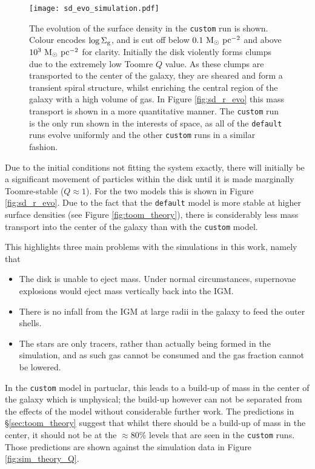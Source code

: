 \begin{figure}[!ht]
    \texttt{[image: sd\_evo\_simulation.pdf]}
    \caption{The evolution of the surface density in the {\tt custom} run is shown. Colour encodes $\log\Sigma_\mathrm{g}$, and is cut off below $0.1 ~\mathrm{M}_{\odot} ~\mathrm{pc}^{-2}$ and above $10^3 ~\mathrm{M}_{\odot} ~\mathrm{pc}^{-2}$ for clarity. Initially the disk violently forms clumps due to the extremely low Toomre $Q$ value. As these clumps are transported to the center of the galaxy, they are sheared and form a transient spiral structure, whilst enriching the central region of the galaxy with a high volume of gas. In Figure \ref{fig:sd_r_evo} this mass transport is shown in a more quantitative manner. The {\tt custom} run is the only run shown in the interests of space, as all of the {\tt default} runs evolve uniformly and the other {\tt custom} runs in a similar fashion.}
    \label{fig:sd_evo_small}
\end{figure}
Due to the initial conditions not fitting the system exactly, there will initially be a significant movement of particles within the disk until it is made marginally Toomre-stable ($Q\approx1$).
For the two models this is shown in Figure \ref{fig:sd_r_evo}.
Due to the fact that the {\tt default} model is more stable at higher surface densities (see Figure \ref{fig:toom_theory}), there is considerably less mass transport into the center of the galaxy than with the {\tt custom} model.

This highlights three main problems with the simulations in this work, namely that
\begin{itemize}
    \item The disk is unable to eject mass. Under normal circumstances, supernovae explosions would eject mass vertically back into the IGM.
    \item There is no infall from the IGM at large radii in the galaxy to feed the outer shells.
    \item The stars are only tracers, rather than actually being formed in the simulation, and as such gas cannot be consumed and the gas fraction cannot be lowered.
\end{itemize}
In the {\tt custom} model in partuclar, this leads to a build-up of mass in the center of the galaxy which is unphysical; the build-up however can not be separated from the effects of the model without considerable further work.
The predictions in \S \ref{sec:toom_theory} suggest that whilst there should be a build-up of mass in the center, it should not be at the $\approx 80\%$ levels that are seen in the {\tt custom} runs.
Those predictions are shown against the simulation data in Figure \ref{fig:sim_theory_Q}.

